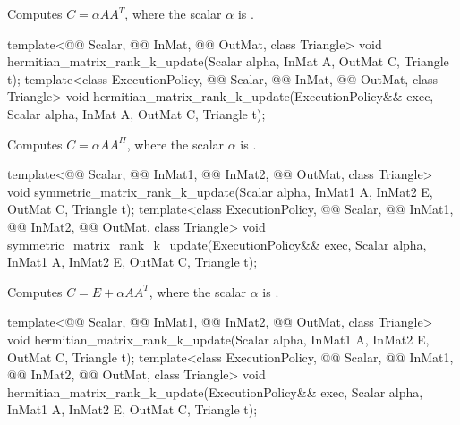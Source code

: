 \begin{itemdescr}
\pnum
\effects
Computes $C = \alpha A A^T$,
where the scalar $\alpha$ is .
\end{itemdescr}

%
\begin{itemdecl}
template<@@ Scalar, @@ InMat, @@ OutMat,
         class Triangle>
void hermitian_matrix_rank_k_update(Scalar alpha, InMat A, OutMat C, Triangle t);
template<class ExecutionPolicy, @@ Scalar, @@ InMat,
         @@ OutMat, class Triangle>
void hermitian_matrix_rank_k_update(ExecutionPolicy&& exec, Scalar alpha, InMat A,
                                    OutMat C, Triangle t);
\end{itemdecl}

\begin{itemdescr}
\pnum
\effects
Computes $C = \alpha A A^H$,
where the scalar $\alpha$ is .
\end{itemdescr}

%
\begin{itemdecl}
template<@@ Scalar, @@ InMat1, @@ InMat2, @@ OutMat,
         class Triangle>
void symmetric_matrix_rank_k_update(Scalar alpha, InMat1 A, InMat2 E, OutMat C, Triangle t);
template<class ExecutionPolicy, @@ Scalar, @@ InMat1, @@ InMat2,
         @@ OutMat, class Triangle>
void symmetric_matrix_rank_k_update(ExecutionPolicy&& exec, Scalar alpha, InMat1 A, InMat2 E,
                                    OutMat C, Triangle t);
\end{itemdecl}

\begin{itemdescr}
\pnum
\effects
Computes $C = E + \alpha A A^T$,
where the scalar $\alpha$ is .
\end{itemdescr}

%
\begin{itemdecl}
template<@@ Scalar, @@ InMat1, @@ InMat2, @@ OutMat,
         class Triangle>
void hermitian_matrix_rank_k_update(Scalar alpha, InMat1 A, InMat2 E, OutMat C, Triangle t);
template<class ExecutionPolicy, @@ Scalar, @@ InMat1, @@ InMat2,
         @@ OutMat, class Triangle>
void hermitian_matrix_rank_k_update(ExecutionPolicy&& exec, Scalar alpha, InMat1 A, InMat2 E,
                                    OutMat C, Triangle t);
\end{itemdecl}

